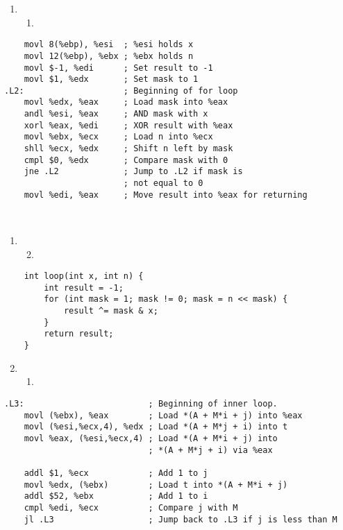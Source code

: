 \documentclass[12pt]{article}
\begin{document}
\begin{enumerate}
	\item
	\begin{enumerate}
		\item
	\end{enumerate}
\end{enumerate}
\begin{verbatim}
	movl 8(%ebp), %esi  ; %esi holds x
	movl 12(%ebp), %ebx ; %ebx holds n
	movl $-1, %edi      ; Set result to -1
	movl $1, %edx       ; Set mask to 1
.L2:                    ; Beginning of for loop
	movl %edx, %eax     ; Load mask into %eax
	andl %esi, %eax     ; AND mask with x
	xorl %eax, %edi     ; XOR result with %eax
	movl %ebx, %ecx     ; Load n into %ecx
	shll %ecx, %edx     ; Shift n left by mask
	cmpl $0, %edx       ; Compare mask with 0
	jne .L2             ; Jump to .L2 if mask is 
                        ; not equal to 0
	movl %edi, %eax     ; Move result into %eax for returning
\end{verbatim}

\quad\\

\begin{enumerate}
	\item
	\begin{enumerate}
		\setcounter{enumii}{1}
		\item
	\end{enumerate}
\end{enumerate}
	\begin{verbatim}
	int loop(int x, int n) {
		int result = -1;
		for (int mask = 1; mask != 0; mask = n << mask) {
			result ^= mask & x;
		}
		return result;
	}
	\end{verbatim}

\newpage

\begin{enumerate}
	\setcounter{enumi}{1}
	\item
	\begin{enumerate}
		\item
	\end{enumerate}
\end{enumerate}
\begin{verbatim}
.L3:                         ; Beginning of inner loop.
	movl (%ebx), %eax        ; Load *(A + M*i + j) into %eax
	movl (%esi,%ecx,4), %edx ; Load *(A + M*j + i) into t 
	movl %eax, (%esi,%ecx,4) ; Load *(A + M*i + j) into 
                             ; *(A + M*j + i) via %eax

	addl $1, %ecx            ; Add 1 to j
	movl %edx, (%ebx)        ; Load t into *(A + M*i + j)
	addl $52, %ebx           ; Add 1 to i
	cmpl %edi, %ecx          ; Compare j with M
	jl .L3                   ; Jump back to .L3 if j is less than M
\end{verbatim}
\end{document}
